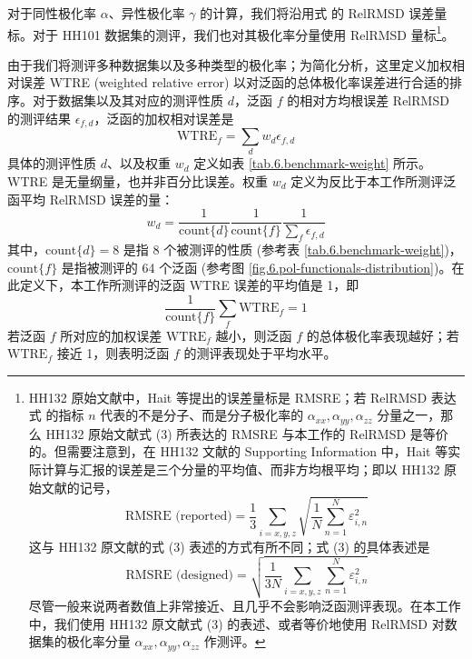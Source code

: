 对于同性极化率 $\alpha$、异性极化率 $\gamma$ 的计算，我们将沿用式  的 RelRMSD 误差量标。对于 HH101 数据集的测评，我们也对其极化率分量使用 RelRMSD 量标\footnote{HH132 原始文献\cite{Hait-Head-Gordon.PCCP.2018}中，Hait 等提出的误差量标是 RMSRE；若 RelRMSD 表达式  的指标 $n$ 代表的不是分子、而是分子极化率的 $\alpha_{xx}, \alpha_{yy}, \alpha_{zz}$ 分量之一，那么 HH132 原始文献式 (3) 所表达的 RMSRE 与本工作的 RelRMSD 是等价的。但需要注意到，在 HH132 文献的 Supporting Information 中，Hait 等实际计算与汇报的误差是三个分量的平均值、而非方均根平均；即以 HH132 原始文献的记号，
$$
\text{RMSRE (reported)} = \frac{1}{3} \sum_{i=x,y,z} \sqrt{\frac{1}{N} \sum_{n=1}^N \varepsilon_{i,n}^2}
$$
这与 HH132 原文献的式 (3) 表述的方式有所不同；式 (3) 的具体表述是
\begin{equation}
    \label{eq.6.rmsre}
    \text{RMSRE (designed)} = \sqrt{\frac{1}{3N} \sum_{i=x,y,z} \sum_{n=1}^N \varepsilon_{i,n}^2}
\end{equation}
尽管一般来说两者数值上非常接近、且几乎不会影响泛函测评表现。在本工作中，我们使用 HH132 原文献式 (3) 的表述、或者等价地使用 RelRMSD 对数据集的极化率分量 $\alpha_{xx}, \alpha_{yy}, \alpha_{zz}$ 作测评。
}。

由于我们将测评多种数据集以及多种类型的极化率；为简化分析，这里定义加权相对误差 WTRE (weighted relative error) 以对泛函的总体极化率误差进行合适的排序。对于数据集以及其对应的测评性质 $d$，泛函 $f$ 的相对方均根误差 RelRMSD 的测评结果 $\epsilon_{f,d}$，泛函的加权相对误差是
\begin{equation}
    \label{eq.6.wtre}
    \mathrm{WTRE}_f = \sum_d w_d \epsilon_{f,d}
\end{equation}
具体的测评性质 $d$、以及权重 $w_d$ 定义如表 \ref{tab.6.benchmark-weight} 所示。WTRE 是无量纲量，也并非百分比误差。权重 $w_d$ 定义为反比于本工作所测评泛函平均 RelRMSD 误差的量：
\begin{equation}
    w_d = \frac{1}{\mathrm{count} \{ d \}} \frac{1}{\mathrm{count} \{ f \}} \frac{1}{\displaystyle \sum_{f} \epsilon_{f,d}}
\end{equation}
其中，$\mathrm{count} \{ d \} = 8$ 是指 8 个被测评的性质 (参考表 \ref{tab.6.benchmark-weight})，$\mathrm{count} \{ f \}$ 是指被测评的 64 个泛函 (参考图 \ref{fig.6.pol-functionals-distribution})。在此定义下，本工作所测评的泛函 WTRE 误差的平均值是 1，即
\begin{equation*}
    \frac{1}{\mathrm{count} \{ f \}} \sum_f \mathrm{WTRE}_f = 1
\end{equation*}
若泛函 $f$ 所对应的加权误差 $\mathrm{WTRE}_f$ 越小，则泛函 $f$ 的总体极化率表现越好；若 $\mathrm{WTRE}_f$ 接近 1，则表明泛函 $f$ 的测评表现处于平均水平。

